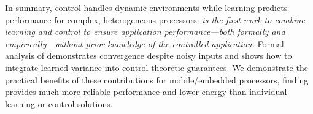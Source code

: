 In summary, control handles dynamic environments while learning
predicts performance for complex, heterogeneous processors.
\emph{\SYSTEM{} is the first work to combine learning and control to
  ensure application performance---both formally and
  empirically---without prior knowledge of the controlled
  application.}  Formal analysis of \SYSTEM{} demonstrates convergence
despite noisy inputs and shows how to integrate learned variance into
control theoretic guarantees.  We demonstrate the practical benefits
of these contributions for mobile/embedded processors, finding
\SYSTEM{} provides much more reliable performance and lower energy
than individual learning or control solutions.


